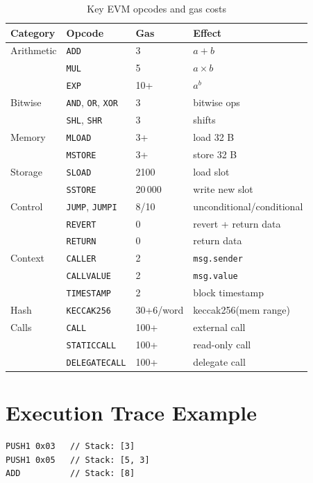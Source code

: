 \documentclass[12pt,a4paper,openany]{book}
\theoremstyle{definition}
\theoremstyle{plain}
\theoremstyle{remark}
\begin{document}
\begin{table}[h]
\centering
\caption{Key EVM opcodes and gas costs}
\begin{tabular}{lllp{4cm}}
\toprule
\textbf{Category} & \textbf{Opcode} & \textbf{Gas} & \textbf{Effect} \\
\midrule
Arithmetic & \texttt{ADD} & 3 & $a+b$ \\
 & \texttt{MUL} & 5 & $a\times b$ \\
 & \texttt{EXP} & 10+ & $a^b$ \\
\midrule
Bitwise & \texttt{AND}, \texttt{OR}, \texttt{XOR} & 3 & bitwise ops \\
 & \texttt{SHL}, \texttt{SHR} & 3 & shifts \\
\midrule
Memory & \texttt{MLOAD} & 3+ & load 32 B \\
 & \texttt{MSTORE} & 3+ & store 32 B \\
\midrule
Storage & \texttt{SLOAD} & 2100 & load slot \\
 & \texttt{SSTORE} & 20\,000 & write new slot \\
\midrule
Control & \texttt{JUMP}, \texttt{JUMPI} & 8/10 & unconditional/conditional \\
 & \texttt{REVERT} & 0 & revert + return data \\
 & \texttt{RETURN} & 0 & return data \\
\midrule
Context & \texttt{CALLER} & 2 & \texttt{msg.sender} \\
 & \texttt{CALLVALUE} & 2 & \texttt{msg.value} \\
 & \texttt{TIMESTAMP} & 2 & block timestamp \\
\midrule
Hash & \texttt{KECCAK256} & 30+6/word & keccak256(mem range) \\
\midrule
Calls & \texttt{CALL} & 100+ & external call \\
 & \texttt{STATICCALL} & 100+ & read-only call \\
 & \texttt{DELEGATECALL} & 100+ & delegate call \\
\bottomrule
\end{tabular}
\end{table}

\section{Execution Trace Example}

\begin{lstlisting}[language={},caption=Computing $3+5$ in EVM bytecode]
PUSH1 0x03   // Stack: [3]
PUSH1 0x05   // Stack: [5, 3]
ADD          // Stack: [8]
\end{lstlisting}
\end{document}
